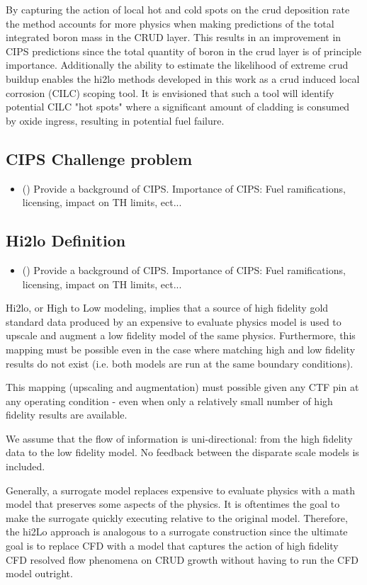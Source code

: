 By capturing the action of local hot and cold spots on the crud deposition rate the method accounts for more physics when making predictions of the total integrated boron mass in the CRUD layer.  This results in an improvement in CIPS predictions since the total quantity of boron in the crud layer is of principle importance.  Additionally the ability to estimate the likelihood of extreme crud buildup enables the hi2lo methods developed in this work as a crud induced local corrosion (CILC) scoping tool.  It is envisioned that such a tool will identify potential CILC "hot spots" where a significant amount of cladding is consumed by oxide ingress, resulting in potential fuel failure.


\subsection{CIPS Challenge problem}

\begin{itemize}
    \item (\checkmark) Provide a background of CIPS.  Importance of CIPS:  Fuel ramifications, licensing, impact on TH limits, ect...
\end{itemize}


\subsection{Hi2lo Definition}

\begin{itemize}
    \item (\checkmark) Provide a background of CIPS.  Importance of CIPS:  Fuel ramifications, licensing, impact on TH limits, ect...
\end{itemize}

Hi2lo, or High to Low modeling, implies that a source of high fidelity gold standard data produced by an expensive to evaluate physics model is used to upscale and augment a low fidelity model of the same physics.
Furthermore, this mapping must be possible even in the case where matching high and low fidelity results do not exist (i.e. both models are run at the same boundary conditions).

This mapping (upscaling and augmentation) must possible given any CTF pin at any operating condition - even when only a relatively small number of high fidelity results are available.

We assume that the flow of information is uni-directional: from the high fidelity data to the low fidelity model.  No feedback between the disparate scale models is included.

Generally, a surrogate model replaces expensive to evaluate physics with a math model that preserves some aspects of the physics.  It is oftentimes the goal to make the surrogate quickly executing relative to the original model. Therefore, the hi2Lo approach is analogous to a surrogate construction since the ultimate goal is to replace CFD with a model that captures the action of high fidelity CFD resolved flow phenomena on CRUD growth without having to run the CFD model outright.


